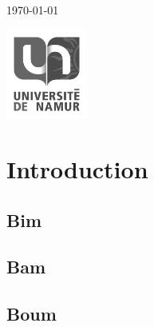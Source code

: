 \documentclass[11pt]{article}
\begin{document}
\begin{titlepage}
	
	
	\vfill\vfill\vfill %
	
	{\large\today} %
	
	
	\vfill\vfill
	\includegraphics[width=0.2\textwidth]{placeholder.png}\\[1cm] %
	 
	
	\vfill %
	
\end{titlepage}
\newpage

\section{Introduction}

\subsection{Bim}

\subsection{Bam}

\subsection{Boum}
\end{document}
